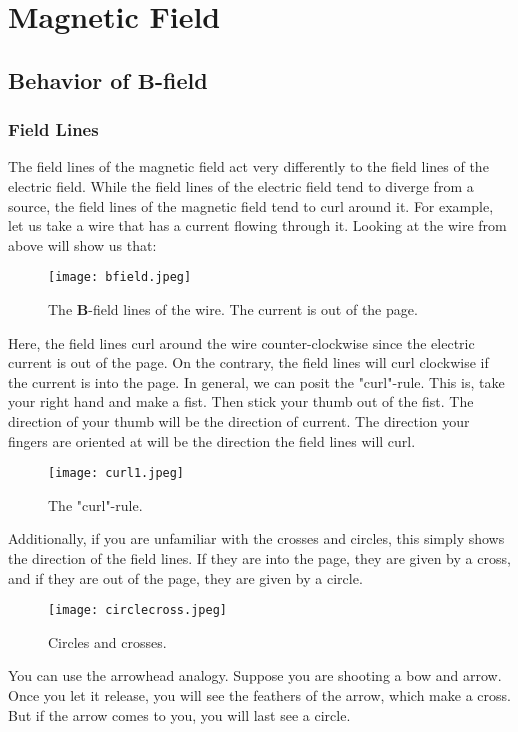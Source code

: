 \documentclass[12pt]{article}
\let\vec\mathbf
\begin{document}
  \section{Magnetic Field}
  \subsection{Behavior of $\vec B$-field}
  \subsubsection{Field Lines}
  The field lines of the magnetic field act very differently to the field lines of the electric field. While the field lines of the electric field tend to diverge from a source, the field lines of the magnetic field tend to curl around it. For example, let us take a wire that has a current flowing through it. Looking at the wire from above will show us that:
  \begin{figure}[H]
  \centering
      \texttt{[image: bfield.jpeg]}
      \caption{The $\vec B$-field lines of the wire. The current is out of the page.}
  \end{figure}
  Here, the field lines curl around the wire counter-clockwise since the electric current is out of the page. On the contrary, the field lines will curl clockwise if the current is into the page. In general, we can posit the "curl"-rule. This is, take your right hand and make a fist. Then stick your thumb out of the fist. The direction of your thumb will be the direction of current. The direction your fingers are oriented at will be the direction the field lines will curl.
  \begin{figure}[H]
  \centering
      \texttt{[image: curl1.jpeg]}
      \caption{The "curl"-rule.}
  \end{figure}
  Additionally, if you are unfamiliar with the crosses and circles, this simply shows the direction of the field lines. If they are into the page, they are given by a cross, and if they are out of the page, they are given by a circle. 
    \begin{figure}[H]
  \centering
      \texttt{[image: circlecross.jpeg]}
      \caption{Circles and crosses.}
  \end{figure}
  You can use the arrowhead analogy. Suppose you are shooting a bow and arrow. Once you let it release, you will see the feathers of the arrow, which make a cross. But if the arrow comes to you, you will last see a circle. 
\end{document}
